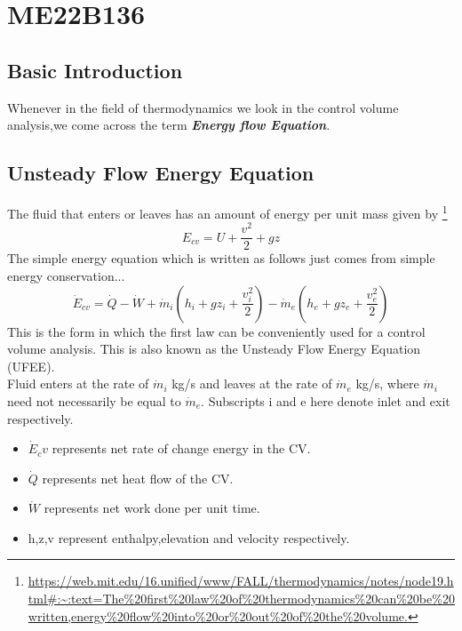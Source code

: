 \section{ME22B136}
\subsection{Basic Introduction}
Whenever in the field of thermodynamics we look in the control volume analysis,we come across the term \textbf{\textit{Energy flow Equation}}.\\
\subsection{Unsteady Flow Energy Equation}
The fluid that enters or leaves has an amount of energy per unit mass given by \footnote{\url{https://web.mit.edu/16.unified/www/FALL/thermodynamics/notes/node19.html\#:~:text=The\%20first\%20law\%20of\%20thermodynamics\%20can\%20be\%20written,energy\%20flow\%20into\%20or\%20out\%20of\%20the\%20volume.}}
\begin{equation}
    E_{cv} = U + \frac{v^2}{2} + gz
\end{equation}
The simple energy equation which is written as follows just comes from simple energy conservation...
\begin{equation}
    \dot E_{cv} = \dot Q - \dot W + \dot m_i(h_i + gz_i + \frac{v_i^2}{2}) - \dot m_e(h_e + gz_e + \frac{v_e^2}{2})
\end{equation}
This is the form in which the first law can be conveniently used for a control volume
analysis. This is also known as the Unsteady Flow Energy Equation (UFEE).\\
Fluid enters at the rate of $\dot m_i$ kg/s and leaves
at the rate of $\dot m_e$ kg/s, where $\dot m_i$ need not necessarily be equal to $\dot m_e$. Subscripts i and e here denote inlet and exit respectively.
\begin{itemize}
    \item $\dot E_cv$ represents net rate of change energy in the CV.
    \item $\dot Q$ represents net heat flow of the CV.
    \item $\dot W$ represents net work done per unit time.
    \item h,z,v represent enthalpy,elevation and velocity respectively.
\end{itemize}
